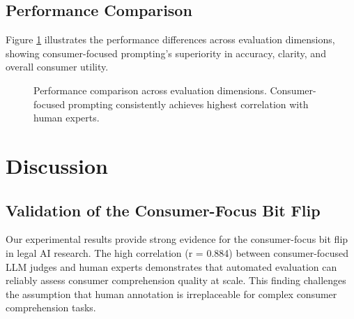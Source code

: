 \documentclass{article}
\begin{document}
\subsection{Performance Comparison}

Figure \ref{fig:performance} illustrates the performance differences across evaluation dimensions, showing consumer-focused prompting's superiority in accuracy, clarity, and overall consumer utility.

\begin{figure}[h]
\centering
{}
\caption{Performance comparison across evaluation dimensions. Consumer-focused prompting consistently achieves highest correlation with human experts.}
\label{fig:performance}
\end{figure}

\section{Discussion}

\subsection{Validation of the Consumer-Focus Bit Flip}

Our experimental results provide strong evidence for the consumer-focus bit flip in legal AI research. The high correlation (r = 0.884) between consumer-focused LLM judges and human experts demonstrates that automated evaluation can reliably assess consumer comprehension quality at scale. This finding challenges the assumption that human annotation is irreplaceable for complex consumer comprehension tasks.
\end{document}

